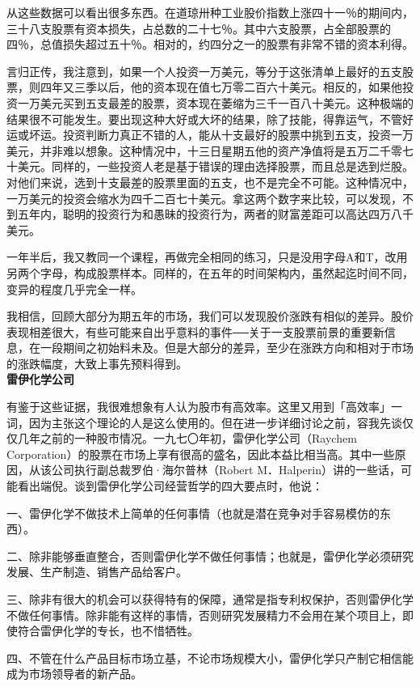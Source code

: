 \documentclass[UTF8,a4paper,zihao=-4,fontset = windows]{ctexart} %
\begin{document}
从这些数据可以看出很多东西。在道琼卅种工业股价指数上涨四十一％的期间内，三十八支股票有资本损失，占总数的二十七％。其中六支股票，占全部股票的四％，总值损失超过五十％。相对的，约四分之一的股票有非常不错的资本利得。

言归正传，我注意到，如果一个人投资一万美元，等分于这张清单上最好的五支股票，则四年又三季以后，他的资本现在值七万零二百六十美元。相反的，如果他投资一万美元买到五支最差的股票，资本现在萎缩为三千一百八十美元。这种极端的结果很不可能发生。要出现这种大好或大坏的结果，除了技能，得靠运气，不管好运或坏运。投资判断力真正不错的人，能从十支最好的股票中挑到五支，投资一万美元，并非难以想象。这种情况中，十三日星期五他的资产净值将是五万二千零七十美元。同样的，一些投资人老是基于错误的理由选择股票，而且总是选到烂股。对他们来说，选到十支最差的股票里面的五支，也不是完全不可能。这种情况中，一万美元的投资会缩水为四千二百七十美元。拿这两个数字来比较，可以发现，不到五年内，聪明的投资行为和愚昧的投资行为，两者的财富差距可以高达四万八千美元。

一年半后，我又教同一个课程，再做完全相同的练习，只是没用字母A和T，改用另两个字母，构成股票样本。同样的，在五年的时间架构内，虽然起迄时间不同，变异的程度几乎完全一样。

我相信，回顾大部分为期五年的市场，我们可以发现股价涨跌有相似的差异。股价表现相差很大，有些可能来自出乎意料的事件──关于一支股票前景的重要新信息，在一段期间之初始料未及。但是大部分的差异，至少在涨跌方向和相对于市场的涨跌幅度，大致上事先预料得到。
\\

\textbf{雷伊化学公司}


有鉴于这些证据，我很难想象有人认为股市有高效率。这里又用到「高效率」一词，因为主张这个理论的人是这么使用的。但在进一步详细讨论之前，容我先谈仅仅几年之前的一种股市情况。一九七〇年初，雷伊化学公司（Raychem Corporation）的股票在市场上享有很高的盛名，因此本益比相当高。其中一些原因，从该公司执行副总裁罗伯·海尔普林（Robert M．Halperin）讲的一些话，可能看出端倪。谈到雷伊化学公司经营哲学的四大要点时，他说：


一、雷伊化学不做技术上简单的任何事情（也就是潜在竞争对手容易模仿的东西）。

二、除非能够垂直整合，否则雷伊化学不做任何事情；也就是，雷伊化学必须研究发展、生产制造、销售产品给客户。

三、除非有很大的机会可以获得特有的保障，通常是指专利权保护，否则雷伊化学不做任何事情。除非能有这样的事情，否则研究发展精力不会用在某个项目上，即使符合雷伊化学的专长，也不惜牺牲。

四、不管在什么产品目标市场立基，不论市场规模大小，雷伊化学只产制它相信能成为市场领导者的新产品。
\end{document}

